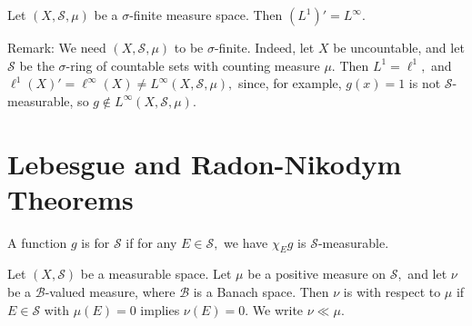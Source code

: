 \begin{thm}
Let $(X,\mathcal{S},\mu)$ be a $\sigma$-finite measure space. Then $(L^1)'=L^{\infty}.$ \\
\end{thm}


\noindent * Remark: We need $(X,\mathcal{S},\mu)$ to be $\sigma$-finite. Indeed, let $X$ be uncountable, and let $\mathcal{S}$ be the $\sigma$-ring of countable sets with counting measure $\mu.$ Then $L^1=\ell^1,$ and \\ $\ell^1(X)'=\ell^{\infty}(X)\neq L^{\infty}(X,\mathcal{S},\mu),$ since, for example, $g(x)=1$ is not $\mathcal{S}$-measurable, so $g\not\in L^{\infty}(X,\mathcal{S},\mu).$

\section{Lebesgue and Radon-Nikodym Theorems}

\begin{defn}
A function $g$ is  for $\mathcal{S}$ if for any $E\in\mathcal{S},$ we have $\chi_Eg$ is $\mathcal{S}$-measurable.
\end{defn}

\begin{defn}
Let $(X,\mathcal{S})$ be a measurable space. Let $\mu$ be a positive measure on $\mathcal{S},$ and let $\nu$ be a $\mathcal{B}$-valued measure, where $\mathcal{B}$ is a Banach space. Then $\nu$ is  with respect to $\mu$ if $E\in\mathcal{S}$ with $\mu(E)=0$ implies $\nu(E)=0.$ We write $\nu\ll\mu.$
\end{defn}


